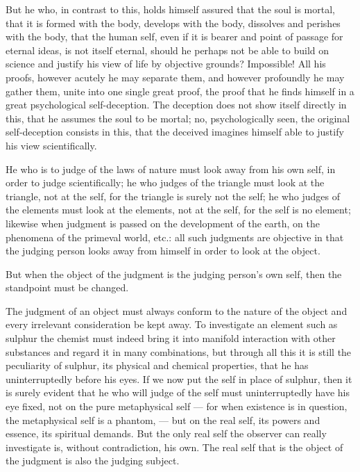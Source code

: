\documentclass[12pt,a4paper,openany]{book}
\newcommand{\opage}[1]{\marginnote{\footnotesize\textit{[#1]}}}
\begin{document}
But he who, in contrast to this, holds himself assured
that the soul is mortal, that it is formed with
the body, develops with the body, dissolves and perishes
with the body, that the human self, even if it
is bearer and point of passage for eternal ideas, is not
itself eternal, should he perhaps not be able to build on
science and justify his view of life by objective
grounds? Impossible! All his proofs, however acutely
he may separate them, and however profoundly he
may gather them, unite into one single great proof, the proof
that he finds himself in a great psychological
self-deception. The deception does not show itself directly in this, that
he assumes the soul to be mortal; no, psychologically seen,
the original self-deception consists in this, that the deceived
imagines himself able to justify his view
scientifically.

He who is to judge of the laws of nature must look away
from his own self, in order to judge scientifically;
he who judges of the triangle must look at the triangle,
not at the self, for the triangle is surely not the self; he
who judges of the elements must look at the
\setcounter{footnote}{0}%
\opage{618}elements, not at the self, for the self is no element;
likewise when judgment is passed on the development of the earth, on the phenomena
of the primeval world, etc.: all such judgments are
objective in that the judging person looks away from himself
in order to look at the object.

But when the object of the judgment is the judging person's
own self, then the standpoint must be changed.

The judgment of an object must always conform to
the nature of the object and every irrelevant
consideration be kept away. To investigate an element
such as sulphur the chemist must indeed bring
it into manifold interaction with other substances
and regard it in many combinations, but through all this
it is still the peculiarity of sulphur, its physical
and chemical properties, that he has uninterruptedly before his eyes.
If we now put the self in place of sulphur, then it is surely
evident that he who will judge of the self
must uninterruptedly have his eye fixed, not on the pure
metaphysical self --- for when existence is in question,
the metaphysical self is a phantom, --- but on the real
self, its powers and essence, its spiritual demands.
But the only real self the observer can really
investigate is, without contradiction, his own. The real
self that is the object of the judgment is also the judging
subject.
\end{document}
